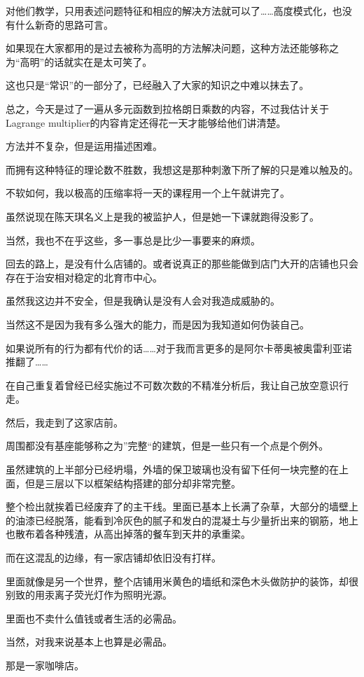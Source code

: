 对他们教学，只用表述问题特征和相应的解决方法就可以了……高度模式化，也没有什么新奇的思路可言。

如果现在大家都用的是过去被称为高明的方法解决问题，这种方法还能够称之为“高明”的话就实在是太可笑了。

这也只是“常识”的一部分了，已经融入了大家的知识之中难以抹去了。

总之，今天是过了一遍从多元函数到拉格朗日乘数的内容，不过我估计关于Lagrange multiplier的内容肯定还得花一天才能够给他们讲清楚。

方法并不复杂，但是运用描述困难。

而拥有这种特征的理论数不胜数，我想这是那种刺激下所了解的只是难以触及的。

不软如何，我以极高的压缩率将一天的课程用一个上午就讲完了。

虽然说现在陈天琪名义上是我的被监护人，但是她一下课就跑得没影了。

当然，我也不在乎这些，多一事总是比少一事要来的麻烦。

回去的路上，是没有什么店铺的。或者说真正的那些能做到店门大开的店铺也只会存在于治安相对稳定的北育市中心。

虽然我这边并不安全，但是我确认是没有人会对我造成威胁的。

当然这不是因为我有多么强大的能力，而是因为我知道如何伪装自己。

如果说所有的行为都有代价的话……对于我而言更多的是阿尔卡蒂奥被奥雷利亚诺推翻了……

在自己重复着曾经已经实施过不可数次数的不精准分析后，我让自己放空意识行走。

然后，我走到了这家店前。

周围都没有基座能够称之为”完整“的建筑，但是一些只有一个点是个例外。

虽然建筑的上半部分已经坍塌，外墙的保卫玻璃也没有留下任何一块完整的在上面，但是三层以下以框架结构搭建的部分却非常完整。

整个检出就挨着已经废弃了的主干线。里面已基本上长满了杂草，大部分的墙壁上的油漆已经脱落，能看到冷灰色的腻子和发白的混凝土与少量折出来的钢筋，地上也散布着各种残渣，从高出掉落的餐车到天井的承重梁。

而在这混乱的边缘，有一家店铺却依旧没有打样。

里面就像是另一个世界，整个店铺用米黄色的墙纸和深色木头做防护的装饰，却很别致的用汞离子荧光灯作为照明光源。

里面也不卖什么值钱或者生活的必需品。

当然，对我来说基本上也算是必需品。

那是一家咖啡店。

